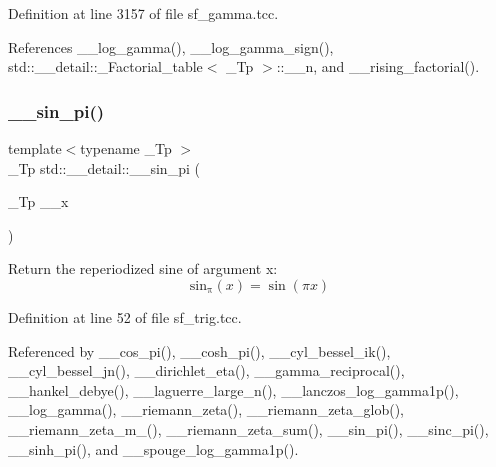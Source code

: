 Definition at line 3157 of file sf\+\_\+gamma.\+tcc.



References \+\_\+\+\_\+log\+\_\+gamma(), \+\_\+\+\_\+log\+\_\+gamma\+\_\+sign(), std\+::\+\_\+\+\_\+detail\+::\+\_\+\+Factorial\+\_\+table$<$ \+\_\+\+Tp $>$\+::\+\_\+\+\_\+n, and \+\_\+\+\_\+rising\+\_\+factorial().

\mbox{\label{namespacestd_1_1____detail_a763249defff6377195818c2fc6e7bca2}} 
\subsubsection{\texorpdfstring{\+\_\+\+\_\+sin\+\_\+pi()}{\_\_sin\_pi()}\hspace{0.1cm}{\footnotesize\ttfamily [1/2]}}
{\footnotesize\ttfamily template$<$typename \+\_\+\+Tp $>$ \\
\+\_\+\+Tp std\+::\+\_\+\+\_\+detail\+::\+\_\+\+\_\+sin\+\_\+pi (\begin{DoxyParamCaption}\item[{\+\_\+\+Tp}]{\+\_\+\+\_\+x }\end{DoxyParamCaption})}

Return the reperiodized sine of argument x\+: \[ \mathrm{sin_\pi}(x) = \sin(\pi x) \] 

Definition at line 52 of file sf\+\_\+trig.\+tcc.



Referenced by \+\_\+\+\_\+cos\+\_\+pi(), \+\_\+\+\_\+cosh\+\_\+pi(), \+\_\+\+\_\+cyl\+\_\+bessel\+\_\+ik(), \+\_\+\+\_\+cyl\+\_\+bessel\+\_\+jn(), \+\_\+\+\_\+dirichlet\+\_\+eta(), \+\_\+\+\_\+gamma\+\_\+reciprocal(), \+\_\+\+\_\+hankel\+\_\+debye(), \+\_\+\+\_\+laguerre\+\_\+large\+\_\+n(), \+\_\+\+\_\+lanczos\+\_\+log\+\_\+gamma1p(), \+\_\+\+\_\+log\+\_\+gamma(), \+\_\+\+\_\+riemann\+\_\+zeta(), \+\_\+\+\_\+riemann\+\_\+zeta\+\_\+glob(), \+\_\+\+\_\+riemann\+\_\+zeta\+\_\+m\+\_(), \+\_\+\+\_\+riemann\+\_\+zeta\+\_\+sum(), \+\_\+\+\_\+sin\+\_\+pi(), \+\_\+\+\_\+sinc\+\_\+pi(), \+\_\+\+\_\+sinh\+\_\+pi(), and \+\_\+\+\_\+spouge\+\_\+log\+\_\+gamma1p().

\mbox{\label{namespacestd_1_1____detail_a5f26e85b3d646e5c69be173baebd4185}} 
